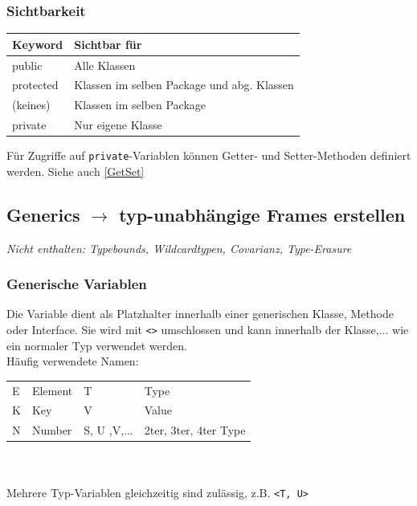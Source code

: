 {    \subsubsection{Sichtbarkeit}
        \vspace{-0.1cm}
        \begin{center}
            \begin{tabular}{ll}
                \rowcolor[RGB]{239,239,239} 
                \textbf{Keyword} & \textbf{Sichtbar für} \\ \hline
                public & Alle Klassen \\
                protected & Klassen im selben Package und abg. Klassen\\
                (keines) & Klassen im selben Package \\
                private & Nur eigene Klasse \\
            \end{tabular}
        \end{center}
        \vspace{-0.2cm}

        Für Zugriffe auf \verb|private|-Variablen können Getter- und Setter-Methoden definiert werden. Siehe auch \ref{GetSet}
        \vspace{-0.1cm} 


\subsection{Generics $\rightarrow$ typ-unabhängige Frames erstellen}
    
    {\small \textit{Nicht enthalten: Typebounds, Wildcardtypen, Covarianz, Type-Erasure}}
    \vspace{-0.1cm} 

    \subsubsection{Generische Variablen}
        Die Variable dient als Platzhalter innerhalb einer generischen Klasse, Methode oder Interface. Sie wird mit \verb|<>| umschlossen 
        und kann innerhalb der Klasse,... wie ein normaler Typ verwendet werden.\\
        Häufig verwendete Namen:\\
        \begin{tabular}{l l|l l}\hline
            E & Element & T & Type\\
            K & Key     & V & Value\\
            N & Number  & S, U ,V,... & 2ter, 3ter, 4ter Type \\\hline
        \end{tabular}\\
        \\
        Mehrere Typ-Variablen gleichzeitig sind zulässig, z.B. \verb|<T, U>|
        \vspace{-0.1cm}

}

